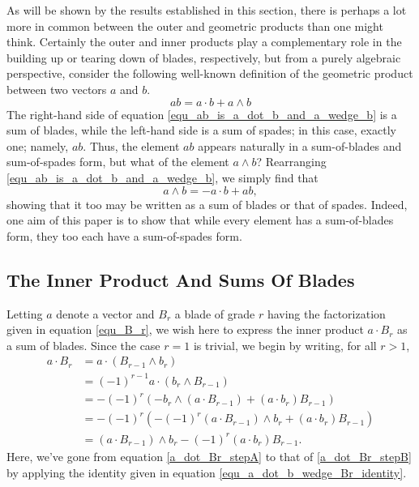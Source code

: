 \documentclass{birkjour}
\theoremstyle{definition}
\theoremstyle{remark}
\numberwithin{equation}{section}
\begin{document}
As will be shown by the results established in this section, there is perhaps a lot more in
common between the outer and geometric products than one might think.  Certainly the outer and
inner products play a complementary role in the building up or tearing down of blades, respectively, but from a
purely algebraic perspective, consider the following well-known definition of the geometric product
between two vectors $a$ and $b$.
\begin{equation}\label{equ_ab_is_a_dot_b_and_a_wedge_b}
ab = a\cdot b + a\wedge b
\end{equation}
The right-hand side of equation \eqref{equ_ab_is_a_dot_b_and_a_wedge_b} is a sum of blades, while the left-hand side is a sum of spades;
in this case, exactly one; namely, $ab$.  Thus, the element $ab$ appears naturally in a sum-of-blades and
sum-of-spades form, but what of the element $a\wedge b$?  Rearranging \eqref{equ_ab_is_a_dot_b_and_a_wedge_b}, we simply find that
\begin{equation}\label{equ_a_wedge_b_is_neg_a_dot_b_and_ab}
a\wedge b = -a\cdot b + ab,
\end{equation}
showing that it too may be written as a sum of blades or that of spades.  Indeed, one aim of this paper
is to show that while every element has a sum-of-blades form, they too each have a sum-of-spades form.

\subsection{The Inner Product And Sums Of Blades}

Letting $a$ denote a vector and $B_r$ a blade of grade $r$ having the factorization
given in equation \eqref{equ_B_r}, we wish here to express the inner product $a\cdot B_r$ as a sum of blades.
Since the case $r=1$ is trivial, we begin by writing, for all $r>1$,
\begin{align}
a\cdot B_r
 &= a\cdot(B_{r-1}\wedge b_r)\nonumber \\
 &= (-1)^{r-1}a\cdot(b_r\wedge B_{r-1})\label{a_dot_Br_stepA} \\
 &= -(-1)^r\left(-b_r\wedge(a\cdot B_{r-1})+(a\cdot b_r)B_{r-1}\right)\label{a_dot_Br_stepB} \\
 &= -(-1)^r\left(-(-1)^r(a\cdot B_{r-1})\wedge b_r+(a\cdot b_r)B_{r-1}\right)\nonumber \\
 &= (a\cdot B_{r-1})\wedge b_r - (-1)^r(a\cdot b_r)B_{r-1}.\label{equ_a_dot_Br_recursive}
\end{align}
Here, we've gone from equation \eqref{a_dot_Br_stepA} to that of \eqref{a_dot_Br_stepB} by
applying the identity given in equation \eqref{equ_a_dot_b_wedge_Br_identity}.
\end{document}
